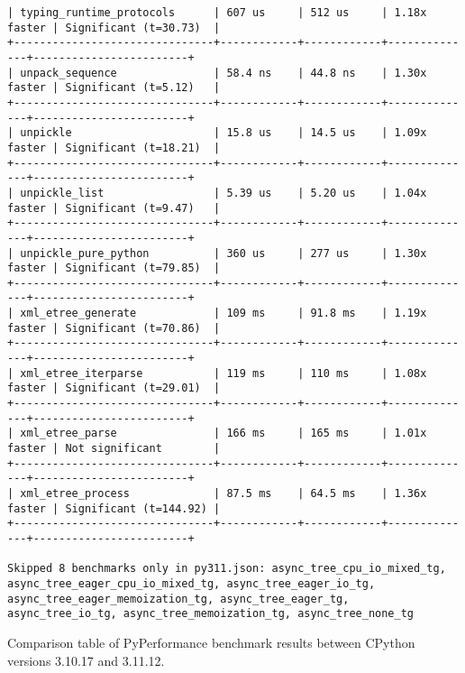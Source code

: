 \begin{code}
\begin{verbatim}
| typing_runtime_protocols      | 607 us     | 512 us     | 1.18x faster | Significant (t=30.73)  |
+-------------------------------+------------+------------+--------------+------------------------+
| unpack_sequence               | 58.4 ns    | 44.8 ns    | 1.30x faster | Significant (t=5.12)   |
+-------------------------------+------------+------------+--------------+------------------------+
| unpickle                      | 15.8 us    | 14.5 us    | 1.09x faster | Significant (t=18.21)  |
+-------------------------------+------------+------------+--------------+------------------------+
| unpickle_list                 | 5.39 us    | 5.20 us    | 1.04x faster | Significant (t=9.47)   |
+-------------------------------+------------+------------+--------------+------------------------+
| unpickle_pure_python          | 360 us     | 277 us     | 1.30x faster | Significant (t=79.85)  |
+-------------------------------+------------+------------+--------------+------------------------+
| xml_etree_generate            | 109 ms     | 91.8 ms    | 1.19x faster | Significant (t=70.86)  |
+-------------------------------+------------+------------+--------------+------------------------+
| xml_etree_iterparse           | 119 ms     | 110 ms     | 1.08x faster | Significant (t=29.01)  |
+-------------------------------+------------+------------+--------------+------------------------+
| xml_etree_parse               | 166 ms     | 165 ms     | 1.01x faster | Not significant        |
+-------------------------------+------------+------------+--------------+------------------------+
| xml_etree_process             | 87.5 ms    | 64.5 ms    | 1.36x faster | Significant (t=144.92) |
+-------------------------------+------------+------------+--------------+------------------------+

Skipped 8 benchmarks only in py311.json: async_tree_cpu_io_mixed_tg, async_tree_eager_cpu_io_mixed_tg, async_tree_eager_io_tg, async_tree_eager_memoization_tg, async_tree_eager_tg, async_tree_io_tg, async_tree_memoization_tg, async_tree_none_tg
    \end{verbatim}
    \caption{Comparison table of PyPerformance benchmark results between CPython versions 3.10.17 and 3.11.12.}
    \label{listing:pyperformance-results-310-311}
\end{code}

